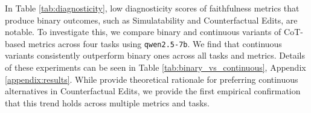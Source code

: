 %

In Table \ref{tab:diagnosticity}, low diagnosticity scores of faithfulness metrics that produce binary outcomes, such as Simulatability and Counterfactual Edits, are notable. To investigate this, we compare binary and continuous variants of CoT-based metrics across four tasks using \texttt{qwen2.5-7b}. We find that continuous variants consistently outperform binary ones across all tasks and metrics. Details of these experiments can be seen in Table \ref{tab:binary_vs_continuous}, Appendix \ref{appendix:results}. While \citet{siegel-etal-2024-probabilities} provide theoretical rationale for preferring continuous alternatives in Counterfactual Edits, we provide the first empirical confirmation that this trend holds across multiple metrics and tasks.